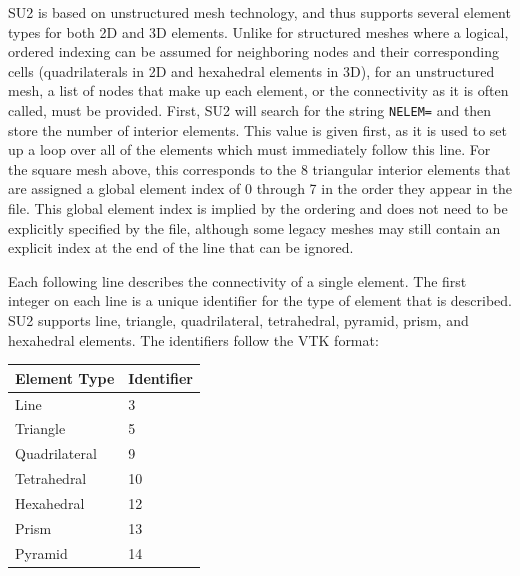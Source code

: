 \documentclass[12pt, a4paper, twoside]{article}
\begin{document}
SU2 is based on unstructured mesh technology, and thus supports several element types for both 2D and 3D elements. Unlike for structured meshes where a logical, ordered indexing can be assumed for neighboring nodes and their corresponding cells (quadrilaterals in 2D and hexahedral elements in 3D), for an unstructured mesh, a list of nodes that make up each element, or the connectivity as it is often called, must be provided. First, SU2 will search for the string \verb|NELEM=| and then store the number of interior elements. This value is given first, as it is used to set up a loop over all of the elements which must immediately follow this line. For the square mesh above, this corresponds to the 8 triangular interior elements that are assigned a global element index of 0 through 7 in the order they appear in the file. This global element index is implied by the ordering and does not need to be explicitly specified by the file, although some legacy meshes may still contain an explicit index at the end of the line that can be ignored.

Each following line describes the connectivity of a single element. The first integer on each line is a unique identifier for the type of element that is described. SU2 supports line, triangle, quadrilateral, tetrahedral, pyramid, prism, and hexahedral elements. The identifiers follow the VTK format:


\begin{center}
    \begin{tabular}{| m{12em} | m{17em} |}
    \textbf{Element Type} & \textbf{Identifier}  \\ [0.5ex]
    \hline\hline 
    Line & 3 \\ [1ex]
    \hline
    Triangle & 5 \\ [1ex]
    \hline
    Quadrilateral & 9\\ [1ex]
    \hline
    Tetrahedral & 10 \\ [1ex]
    \hline
    Hexahedral & 12 \\ [1ex]
    \hline
    Prism & 13 \\ [1ex]
    \hline
    Pyramid & 14 \\ [1ex]
    \hline

    \end{tabular}
\end{center}
\end{document}
